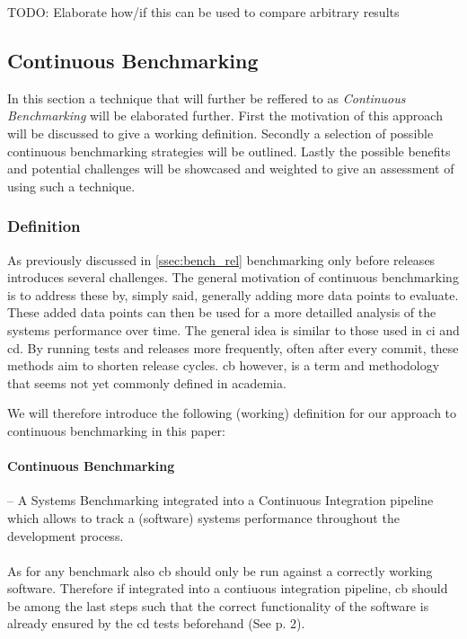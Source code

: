 \documentclass[	runningheads,
				a4paper]{llncs}
\begin{document}
TODO: Elaborate how/if this can be used to compare arbitrary results

	\subsection{Continuous Benchmarking}
In this section a technique that will further be reffered to as \textit{Continuous Benchmarking} will be elaborated further. First the motivation of this approach will be discussed to give a working definition. Secondly a selection of possible continuous benchmarking strategies will be outlined. Lastly the possible benefits and potential challenges will be showcased and weighted to give an assessment of using such a technique.

	\subsubsection{Definition}
	As previously discussed in \autoref{ssec:bench_rel} benchmarking only before releases introduces several challenges. The general motivation of continuous benchmarking is to address these by, simply said, generally adding more data points to evaluate. These added data points can then be used for a more detailled analysis of the systems performance over time. The general idea is similar to those used in \gls{ci} and \gls{cd}. By running tests and releases more frequently, often after every commit, these methods aim to shorten release cycles. \gls{cb} however, is a term and methodology that seems not yet commonly defined in academia.

	We will therefore introduce the following (working) definition for our approach to continuous benchmarking in this paper:
	\paragraph{Continuous Benchmarking} -- A Systems Benchmarking integrated into a Continuous Integration pipeline which allows to track a (software) systems performance throughout the development process.



	\paragraph{}As for any benchmark also \gls{cb} should only be run against a correctly working software. Therefore if integrated into a contiuous integration pipeline, \gls{cb} should be among the last steps such that the correct functionality of the software is already ensured by the \gls{cd} tests beforehand (See \cite{grambow2019} p. 2).
\end{document}

